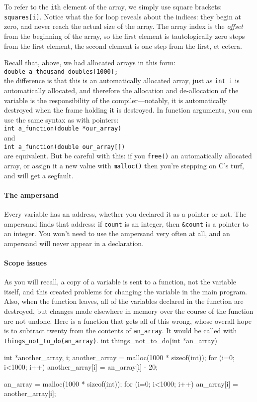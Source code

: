 \documentclass[12pt]{article}
\begin{document}
To refer to the {\tt i}th element of the array, we simply use square
brackets: {\tt squares[i]}. Notice what the for loop reveals about
the indices: they begin at zero, and never reach the actual size of
the array. The array index is the {\sl offset} from the beginning of
the array, so the first element is tautologically zero steps from the first element,
the second element is one step from the first, et cetera. 

Recall that, above, we had allocated arrays in this form:\\
{\tt double a\_thousand\_doubles[1000];}\\
the difference is that this is an automatically allocated array, just
as {\tt int i} is automatically allocated, and therefore
the allocation and de-allocation of the variable is the responsibility
of the compiler---notably, it is automatically destroyed when the frame
holding it is destroyed. In function arguments, you can use the same
syntax as with pointers: 
\\ {\tt int a\_function(double *our\_array)}\\
and
\\ {\tt int a\_function(double our\_array[])}\\
are equivalent.
But be careful with this: if you {\tt free()} an automatically allocated
array, or assign it a new value with {\tt malloc()} then you're stepping
on C's turf, and will get a segfault.

\paragraph{The ampersand}\index{\&} Every variable has an address, whether you
declared it as a pointer or not. The ampersand finds that address: if
{\tt count} is an integer, then {\tt \&count} is a pointer to an integer.
You won't need to use the ampersand very often at all, and 
an ampersand will never appear in a declaration.

\paragraph{Scope issues} As you will recall, a copy of a variable is sent to a function, not the variable
itself, and this created problems for changing the variable in the main program. Also, when the function
leaves, all of the variables declared in the function are destroyed,
but changes made elsewhere in memory over the course of the function
are not undone. Here is a function that gets all of this wrong, whose overall hope is to subtract twenty
from the contents of {\tt an\_array}. It would be called with {\tt things\_not\_to\_do(an\_array)}.
int things_not_to_do(int *an_array){
int *another_array, i;
another_array = malloc(1000 * sizeof(int));
for (i=0; i<1000; i++)
    another_array[i] = an_array[i] - 20;

an_array = malloc(1000 * sizeof(int));
for (i=0; i<1000; i++)
    an_array[i] = another_array[i];
}
\end{document}
